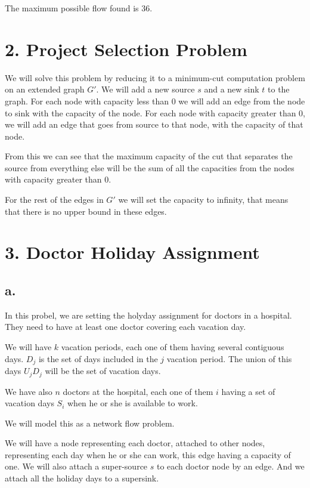 \documentclass{article}
\begin{document}
The maximum possible flow found is 36.

\section*{2. Project Selection Problem}

We will solve this problem by reducing it to a minimum-cut computation problem on an extended graph $G'$. We will add a new source $s$ and a new sink $t$ to the graph. For each node with capacity less than 0  we will add an edge from the node to sink with the capacity of the node. For each node with capacity greater than 0, we will add an edge that goes from source to that node, with the capacity of that node.

From this we can see that the maximum capacity of the cut that separates the source from everything else will be the sum of all the capacities from the nodes with capacity greater than 0.

For the rest of the edges in $G'$ we will set the capacity to infinity, that means that there is no upper bound in these edges.

\section*{3. Doctor Holiday Assignment}

\subsection*{a.}

In this probel, we are setting the holyday assignment for doctors in a hospital. They need to have at least one doctor covering each vacation day.

We will have $k$ vacation periods, each one of them having several contiguous days. $D_j$ is the set of days included in the $j$ vacation period. The union of this days $U_j D_j$ will be the set of vacation days.

We have also $n$ doctors at the hospital, each one of them $i$ having a set of vacation days $S_i$ when he or she is available to work.

We will model this as a network flow problem.

We will have a node representing each doctor, attached to other nodes, representing each day when he or she can work, this edge having a capacity of one. We will also attach a super-source $s$ to each doctor node by an edge. And we attach all the holiday days to a supersink.
\end{document}
